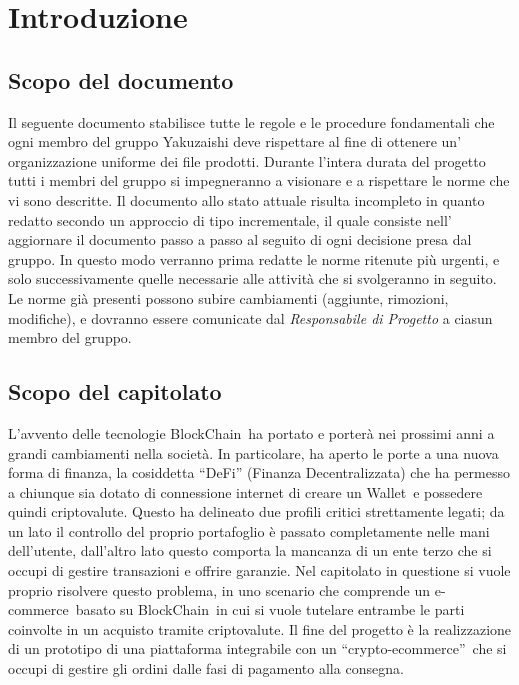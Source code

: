 \section{Introduzione}
\subsection {Scopo del documento}
Il seguente documento stabilisce tutte le regole e le procedure fondamentali che ogni membro del gruppo Yakuzaishi deve rispettare al fine di ottenere un' organizzazione uniforme dei file prodotti.
Durante l'intera durata del progetto tutti i membri del gruppo si impegneranno a visionare e a rispettare le norme che vi sono descritte.
Il documento allo stato attuale risulta incompleto in quanto redatto secondo un approccio di tipo incrementale, il quale consiste nell' aggiornare il documento passo a passo al seguito di ogni decisione presa dal gruppo.
In questo modo verranno prima redatte le norme ritenute più urgenti, e solo successivamente quelle necessarie alle attività che si svolgeranno in seguito.
Le norme già presenti possono subire cambiamenti (aggiunte, rimozioni, modifiche), e dovranno essere comunicate dal \textit{Responsabile di Progetto} a ciasun membro del gruppo.

\subsection{Scopo del capitolato}
L'avvento delle tecnologie BlockChain\glo\ ha portato e porterà nei prossimi anni a grandi cambiamenti nella società. 
In particolare, ha aperto le porte a una nuova forma di finanza, la cosiddetta “DeFi” (Finanza Decentralizzata) che ha permesso a chiunque sia dotato di connessione internet di creare un Wallet\glo\ e possedere quindi criptovalute\glo.
Questo ha delineato due profili critici strettamente legati; da un lato il controllo del proprio portafoglio è passato completamente nelle mani dell'utente, dall'altro lato questo comporta la mancanza di un ente terzo che si occupi di gestire transazioni e offrire garanzie.
\newline
Nel capitolato in questione si vuole proprio risolvere questo problema, in uno scenario che comprende un e-commerce\glo\ basato su BlockChain\glo\ in cui si vuole tutelare entrambe le parti coinvolte in un acquisto tramite criptovalute.
\newline
Il fine del progetto è la realizzazione di un prototipo di una piattaforma integrabile con un “crypto-ecommerce”\glo\, che si occupi di gestire gli ordini dalle fasi di pagamento alla consegna.

